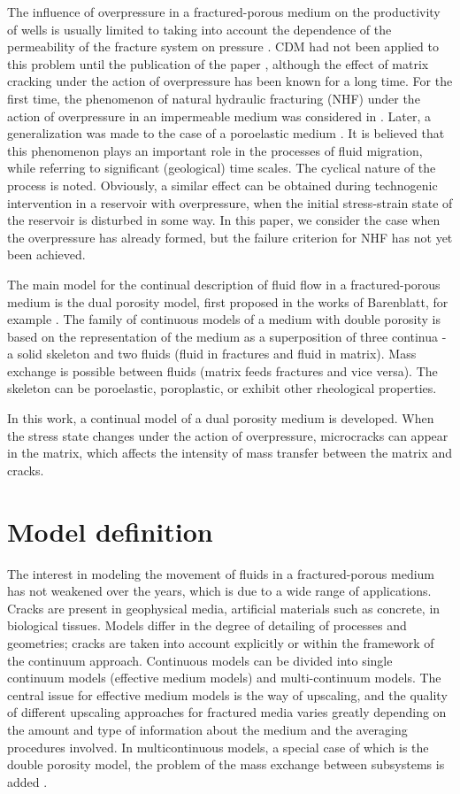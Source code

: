 \documentclass[article,authoryear,jpm]{beg_39}             %
\begin{document}
The influence of overpressure in a fractured-porous medium on the productivity of wells is usually limited to taking into account the dependence of the permeability of the fracture system on pressure \cite{Thompson}.
CDM had not been applied to this problem until the publication of the paper \cite{Izvekov2020}, although the effect of matrix cracking under the action of overpressure has been known for a long time.
For the first time, the phenomenon of natural hydraulic fracturing (NHF) under the action of overpressure in an impermeable medium was considered in \cite{Secor}.
Later, a generalization was made to the case of a poroelastic medium \cite{Engelder, Luo}.
It is believed that this phenomenon plays an important role in the processes of fluid migration, while referring to significant (geological) time scales.
The cyclical nature of the process is noted.
Obviously, a similar effect can be obtained during technogenic intervention in a reservoir with overpressure, when the initial stress-strain state of the reservoir is disturbed in some way.
In this paper, we consider the case when the overpressure has already formed, but the failure criterion for NHF has not yet been achieved.

The main model for the continual description of fluid flow in a fractured-porous medium is the dual porosity model, first proposed in the works of Barenblatt, for example \cite{Barenblatt}.
The family of continuous models of a medium with double porosity is based on the representation of the medium as a superposition of three continua - a solid skeleton and two fluids (fluid in fractures and fluid in matrix).
Mass exchange is possible between fluids (matrix feeds fractures and vice versa).
The skeleton can be poroelastic, poroplastic, or exhibit other rheological properties.

In this work, a continual model of a dual porosity medium is developed.
When the stress state changes under the action of overpressure, microcracks can appear in the matrix, which affects the intensity of mass transfer between the matrix and cracks.

\section{Model definition}
\label{sec:1}
The interest in modeling the movement of fluids in a fractured-porous medium has not weakened over the years, which is due to a wide range of applications.
Cracks are present in geophysical media, artificial materials such as concrete, in biological tissues.
Models differ in the degree of detailing of processes and geometries; cracks are taken into account explicitly or within the framework of the continuum approach.
Continuous models can be divided into single continuum models (effective medium models) and multi-continuum models.
The central issue for effective medium models is the way of upscaling, and the quality of different upscaling approaches for fractured media varies greatly depending on the amount and type of information about the medium and the averaging procedures involved.
In multicontinuous models, a special case of which is the double porosity model, the problem of the mass exchange between subsystems is added \cite{Berre}.
\end{document}
